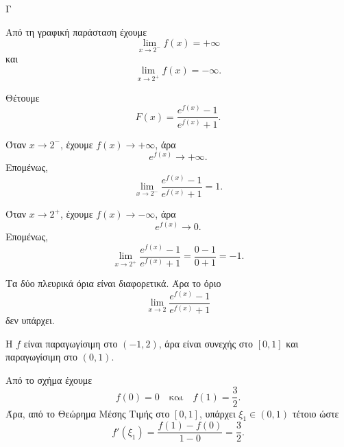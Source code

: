 
\begin{thema}{Γ}

\begin{center}
\end{center}

\begin{erwthma}
\item Από τη γραφική παράσταση έχουμε
\[
\lim_{x\to 2^-}f(x)=+\infty
\]
και
\[
\lim_{x\to 2^+}f(x)=-\infty.
\]

Θέτουμε
\[
F(x)=\frac{e^{f(x)}-1}{e^{f(x)}+1}.
\]

Όταν $x\to 2^-$, έχουμε $f(x)\to+\infty$, άρα
\[
e^{f(x)}\to+\infty.
\]
Επομένως,
\[
\lim_{x\to 2^-}\frac{e^{f(x)}-1}{e^{f(x)}+1}=1.
\]

Όταν $x\to 2^+$, έχουμε $f(x)\to-\infty$, άρα
\[
e^{f(x)}\to 0.
\]
Επομένως,
\[
\lim_{x\to 2^+}\frac{e^{f(x)}-1}{e^{f(x)}+1}
=\frac{0-1}{0+1}=-1.
\]

Τα δύο πλευρικά όρια είναι διαφορετικά. Άρα το όριο
\[
\lim_{x\to 2}\frac{e^{f(x)}-1}{e^{f(x)}+1}
\]
δεν υπάρχει.

\item Η $f$ είναι παραγωγίσιμη στο $(-1,2)$, άρα είναι συνεχής στο $[0,1]$ και παραγωγίσιμη στο $(0,1)$.

Από το σχήμα έχουμε
\[
f(0)=0
\quad \text{και}\quad
f(1)=\frac{3}{2}.
\]
Άρα, από το Θεώρημα Μέσης Τιμής στο $[0,1]$, υπάρχει $\xi_1\in(0,1)$ τέτοιο ώστε
\[
f'(\xi_1)=\frac{f(1)-f(0)}{1-0}
=\frac{3}{2}.
\]


\end{erwthma}
\end{thema}
